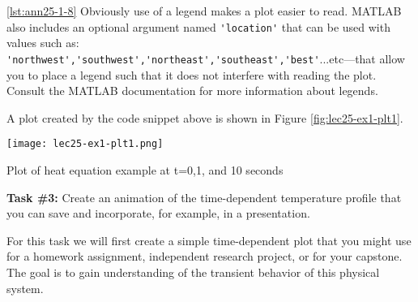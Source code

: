 \vspace{0.15cm}

\noindent \ref{lst:ann25-1-8} Obviously use of a legend makes a plot easier to read.  MATLAB also includes an optional argument named \lstinline{'location'} that can be used with values such as: \lstinline{'northwest','southwest','northeast','southeast','best'}...etc---that allow you to place a legend such that it does not interfere with reading the plot.  Consult the MATLAB documentation for more information about legends.

\vspace{0.15cm}

\noindent A plot created by the code snippet above is shown in Figure \ref{fig:lec25-ex1-plt1}.
\begin{marginfigure}
\texttt{[image: lec25-ex1-plt1.png]}
\caption{Plot of heat equation example at t=0,1, and 10 seconds}
\label{fig:lec25-ex1-plt1}
\end{marginfigure}

\vspace{0.25cm}

\setcounter{lstannotation}{0} %
\noindent\textbf{Task \#3: } Create an animation of the time-dependent temperature profile that you can save and incorporate, for example, in a presentation.

\vspace{0.15cm}

\noindent For this task we will first create a simple time-dependent plot that you might use for a homework assignment, independent research project, or for your capstone.  The goal is to gain understanding of the transient behavior of this physical system.

